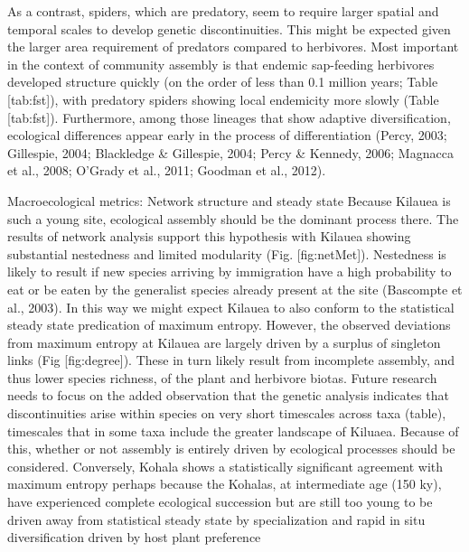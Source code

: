 \documentclass[12pt]{article}
\begin{document}
\begin{linenumbers}
As a contrast, spiders, which are predatory, seem to require larger spatial and temporal scales to develop genetic discontinuities. This might be expected given the larger area requirement of predators compared to herbivores.  Most important in the context of community assembly is that endemic sap-feeding herbivores developed structure quickly (on the order of less than 0.1 million years; Table [tab:fst]), with predatory spiders showing local endemicity more slowly (Table [tab:fst]). Furthermore, among those lineages that show adaptive diversification, ecological differences appear early in the process of differentiation (Percy, 2003; Gillespie, 2004; Blackledge & Gillespie, 2004; Percy & Kennedy, 2006; Magnacca et al., 2008; O’Grady et al., 2011; Goodman et al., 2012).

Macroecological metrics: Network structure and steady state
Because Kilauea is such a young site, ecological assembly should be the dominant  process there. The results of network analysis support this hypothesis with Kilauea showing substantial nestedness and limited modularity (Fig. [fig:netMet]). Nestedness is likely to result if new species arriving by immigration have a high probability to eat or be eaten by the generalist species already present at the site (Bascompte et al., 2003). In this way we might expect Kilauea to also conform to the statistical steady state predication of maximum entropy. However, the observed deviations from maximum entropy at Kilauea are largely driven by a surplus of singleton links (Fig [fig:degree]). These in turn likely result from incomplete assembly, and thus lower species richness, of the plant and herbivore biotas. Future research needs to focus on the added observation that the genetic analysis indicates that discontinuities arise within species on very short timescales across taxa (table), timescales that in some taxa include the greater landscape of Kiluaea. Because of this, whether or not assembly is entirely driven by ecological processes should be considered.  Conversely, Kohala shows a statistically significant agreement with maximum entropy perhaps because the Kohalas, at intermediate age (150 ky), have experienced complete ecological succession but are still too young to be driven away from statistical steady state by specialization and rapid in situ diversification driven by host plant preference

\end{linenumbers}
\end{document}
